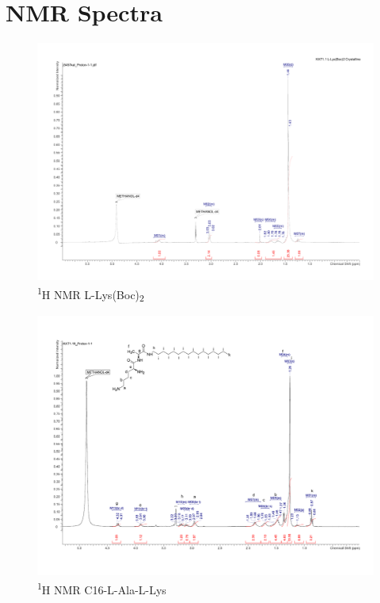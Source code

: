 \chapter{NMR Spectra} %

\label{NMR} %

\begin{figure}[ht!]
\centering
\includegraphics[scale=0.47]{NMR/KAT1_1.pdf}
\caption{\textsuperscript{1}H NMR L-Lys(Boc)\textsubscript{2}}
\label{KAT1.1_NMR2}
\end{figure}

\begin{figure}[ht!]
\centering
\includegraphics[scale=0.47]{NMR/KAT1_19.pdf}
\caption{\textsuperscript{1}H NMR C16-L-Ala-L-Lys}
\label{KAT1.19_NMR2}
\end{figure}

